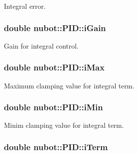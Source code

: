 Integral error. 

\hypertarget{classnubot_1_1PID_ac7b246ff55dc55bf825432fa362af235}{
\subsubsection[{i\-Gain}]{\setlength{\rightskip}{0pt plus 5cm}double nubot\-::\-P\-I\-D\-::i\-Gain\hspace{0.3cm}{\ttfamily [private]}}}\label{classnubot_1_1PID_ac7b246ff55dc55bf825432fa362af235}


Gain for integral control. 

\hypertarget{classnubot_1_1PID_a23926b1473b7ad4cbbd9fb565b94712e}{
\subsubsection[{i\-Max}]{\setlength{\rightskip}{0pt plus 5cm}double nubot\-::\-P\-I\-D\-::i\-Max\hspace{0.3cm}{\ttfamily [private]}}}\label{classnubot_1_1PID_a23926b1473b7ad4cbbd9fb565b94712e}


Maximum clamping value for integral term. 

\hypertarget{classnubot_1_1PID_aabd36c7c162217550544931b749e4a7e}{
\subsubsection[{i\-Min}]{\setlength{\rightskip}{0pt plus 5cm}double nubot\-::\-P\-I\-D\-::i\-Min\hspace{0.3cm}{\ttfamily [private]}}}\label{classnubot_1_1PID_aabd36c7c162217550544931b749e4a7e}


Minim clamping value for integral term. 

\hypertarget{classnubot_1_1PID_ad05e98c72f5396f4bd32e729ede59ad1}{
\subsubsection[{i\-Term}]{\setlength{\rightskip}{0pt plus 5cm}double nubot\-::\-P\-I\-D\-::i\-Term\hspace{0.3cm}{\ttfamily [private]}}}\label{classnubot_1_1PID_ad05e98c72f5396f4bd32e729ede59ad1}


